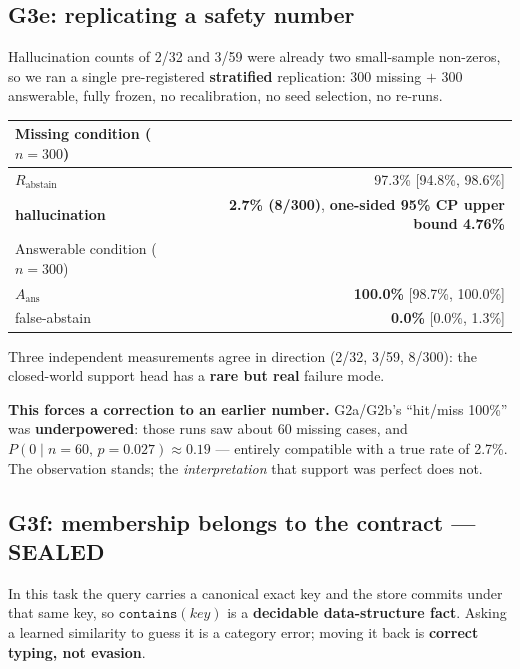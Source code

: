 \documentclass[11pt, a4paper]{article}
\newcommand{\SEALED}{\textcolor{blue!60!black}{\textbf{SEALED}}}
\begin{document}
\subsection{G3e: replicating a safety number}\label{sec:g3e}

Hallucination counts of 2/32 and 3/59 were already two small-sample non-zeros, so we ran a
single pre-registered \textbf{stratified} replication: 300 missing $+$ 300 answerable,
fully frozen, no recalibration, no seed selection, no re-runs.

\begin{table}[h]
\centering\small
\begin{tabular}{lr}
\toprule
Missing condition ($n{=}300$) & \\
\midrule
$R_{\mathrm{abstain}}$ & 97.3\% [94.8\%, 98.6\%] \\
\textbf{hallucination} & \textbf{2.7\% (8/300)}, \textbf{one-sided 95\% CP upper bound 4.76\%} \\
\midrule
Answerable condition ($n{=}300$) & \\
\midrule
$A_{\mathrm{ans}}$ & \textbf{100.0\%} [98.7\%, 100.0\%] \\
false-abstain & \textbf{0.0\%} [0.0\%, 1.3\%] \\
\bottomrule
\end{tabular}
\end{table}

Three independent measurements agree in direction (2/32, 3/59, 8/300): the closed-world
support head has a \textbf{rare but real} failure mode.

\textbf{This forces a correction to an earlier number.} G2a/G2b's ``hit/miss 100\%'' was
\textbf{underpowered}: those runs saw about 60 missing cases, and
$P(0 \mid n{=}60,\, p{=}0.027) \approx 0.19$ --- entirely compatible with a true rate of
2.7\%. The observation stands; the \emph{interpretation} that support was perfect does not.

\subsection{G3f: membership belongs to the contract --- \SEALED{}}

In this task the query carries a canonical exact key and the store commits under that same
key, so $\texttt{contains}(key)$ is a \textbf{decidable data-structure fact}. Asking a
learned similarity to guess it is a category error; moving it back is \textbf{correct
typing, not evasion}.
\end{document}

